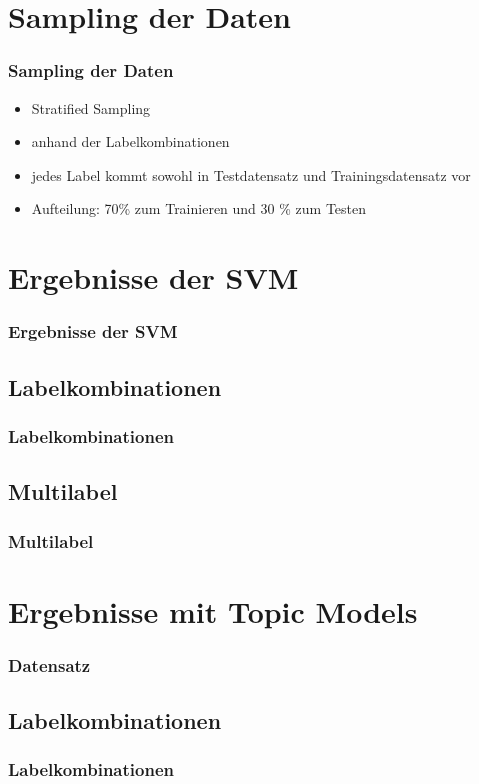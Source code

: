 \documentclass[12pt, xcolor=table]{beamer}
\begin{document}
\section{Sampling der Daten}
\begin{frame}
    \frametitle{Sampling der Daten}
    \begin{itemize}
        \item Stratified Sampling
        \item anhand der Labelkombinationen
        \item jedes Label kommt sowohl in Testdatensatz und Trainingsdatensatz vor
        \item Aufteilung: 70\% zum Trainieren und 30 \% zum Testen
    \end{itemize}
\end{frame}

\section{Ergebnisse der SVM}
\begin{frame}
    \frametitle{Ergebnisse der SVM}
\end{frame}
\subsection{Labelkombinationen} %
\begin{frame}
    \frametitle{Labelkombinationen}
\end{frame}

\subsection{Multilabel} %
\begin{frame}
    \frametitle{Multilabel}
\end{frame}

\section{Ergebnisse mit Topic Models}
\begin{frame}
    \frametitle{Datensatz}
\end{frame}
\subsection{Labelkombinationen} %
\begin{frame}
     \frametitle{Labelkombinationen}
\end{frame}
\end{document}
